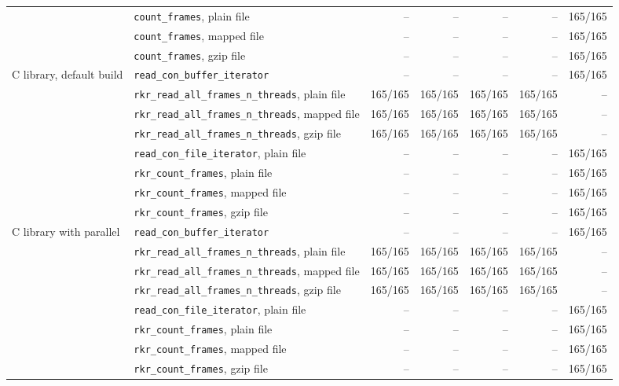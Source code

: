 \begin{table}[tbp]
{\begin{tabular}{@{}llrrrrr@{}}
 & \texttt{count\_frames}, plain file & -- & -- & -- & -- & 165/165 \\
 & \texttt{count\_frames}, mapped file & -- & -- & -- & -- & 165/165 \\
 & \texttt{count\_frames}, gzip file & -- & -- & -- & -- & 165/165 \\
\midrule
C library, default build & \texttt{read\_con\_buffer\_iterator} & -- & -- & -- & -- & 165/165 \\
 & \texttt{rkr\_read\_all\_frames\_n\_threads}, plain file & 165/165 & 165/165 & 165/165 & 165/165 & -- \\
 & \texttt{rkr\_read\_all\_frames\_n\_threads}, mapped file & 165/165 & 165/165 & 165/165 & 165/165 & -- \\
 & \texttt{rkr\_read\_all\_frames\_n\_threads}, gzip file & 165/165 & 165/165 & 165/165 & 165/165 & -- \\
 & \texttt{read\_con\_file\_iterator}, plain file & -- & -- & -- & -- & 165/165 \\
 & \texttt{rkr\_count\_frames}, plain file & -- & -- & -- & -- & 165/165 \\
 & \texttt{rkr\_count\_frames}, mapped file & -- & -- & -- & -- & 165/165 \\
 & \texttt{rkr\_count\_frames}, gzip file & -- & -- & -- & -- & 165/165 \\
\midrule
C library with parallel & \texttt{read\_con\_buffer\_iterator} & -- & -- & -- & -- & 165/165 \\
 & \texttt{rkr\_read\_all\_frames\_n\_threads}, plain file & 165/165 & 165/165 & 165/165 & 165/165 & -- \\
 & \texttt{rkr\_read\_all\_frames\_n\_threads}, mapped file & 165/165 & 165/165 & 165/165 & 165/165 & -- \\
 & \texttt{rkr\_read\_all\_frames\_n\_threads}, gzip file & 165/165 & 165/165 & 165/165 & 165/165 & -- \\
 & \texttt{read\_con\_file\_iterator}, plain file & -- & -- & -- & -- & 165/165 \\
 & \texttt{rkr\_count\_frames}, plain file & -- & -- & -- & -- & 165/165 \\
 & \texttt{rkr\_count\_frames}, mapped file & -- & -- & -- & -- & 165/165 \\
 & \texttt{rkr\_count\_frames}, gzip file & -- & -- & -- & -- & 165/165 \\
\bottomrule
\end{tabular}}
\end{table}
